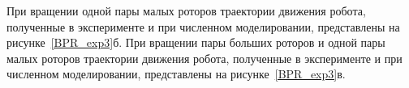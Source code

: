 При вращении одной пары малых роторов траектории движения робота, полученные в эксперименте и при численном моделировании, представлены на рисунке~\ref{BPR_exp3}б. %
При вращении пары больших роторов и одной пары малых роторов траектории движения робота, полученные в эксперименте и при численном моделировании, представлены на рисунке~\ref{BPR_exp3}в. %
